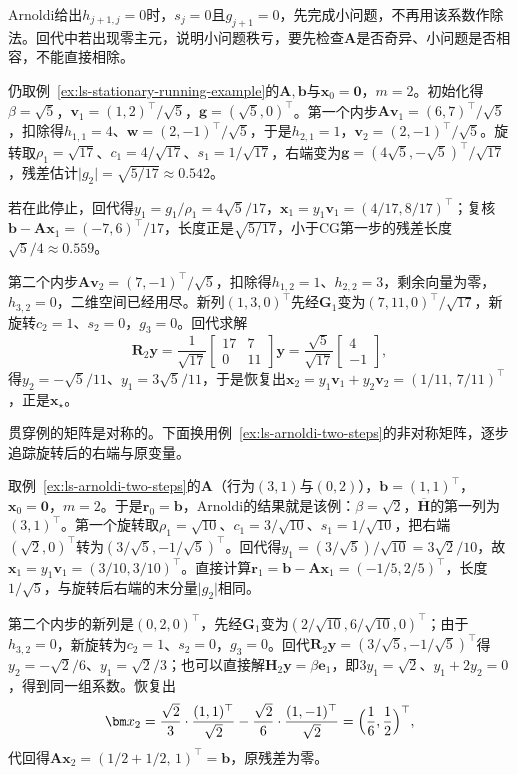 Arnoldi给出$h_{j+1,j}=0$时，$s_j=0$且$g_{j+1}=0$，先完成小问题，不再用该系数作除法。回代中若出现零主元，说明小问题秩亏，要先检查$\bm A$是否奇异、小问题是否相容，不能直接相除。

\begin{example}[GMRES在贯穿例上的两步]
\label{ex:ls-gmres-two-steps}
仍取例~\ref{ex:ls-stationary-running-example}的$\bm A,\bm b$与$\bm x_0=\bm 0$，$m=2$。初始化得$\beta=\sqrt5$，$\bm v_1=(1,2)^\top/\sqrt5$，$\bm g=(\sqrt5,0)^\top$。第一个内步$\bm A\bm v_1=(6,7)^\top/\sqrt5$，扣除得$h_{1,1}=4$、$\bm w=(2,-1)^\top/\sqrt5$，于是$h_{2,1}=1$，$\bm v_2=(2,-1)^\top/\sqrt5$。旋转取$\rho_1=\sqrt{17}$、$c_1=4/\sqrt{17}$、$s_1=1/\sqrt{17}$，右端变为$\bm g=(4\sqrt5,-\sqrt5)^\top/\sqrt{17}$，残差估计$\lvert g_2\rvert=\sqrt{5/17}\approx0.542$。

若在此停止，回代得$y_1=g_1/\rho_1=4\sqrt5/17$，$\bm x_1=y_1\bm v_1=(4/17,8/17)^\top$；复核$\bm b-\bm A\bm x_1=(-7,6)^\top/17$，长度正是$\sqrt{5/17}$，小于CG第一步的残差长度$\sqrt5/4\approx0.559$。

第二个内步$\bm A\bm v_2=(7,-1)^\top/\sqrt5$，扣除得$h_{1,2}=1$、$h_{2,2}=3$，剩余向量为零，$h_{3,2}=0$，二维空间已经用尽。新列$(1,3,0)^\top$先经$\bm G_1$变为$(7,11,0)^\top/\sqrt{17}$，新旋转$c_2=1$、$s_2=0$，$g_3=0$。回代求解
\[
 \bm R_2\bm y=\frac1{\sqrt{17}}\begin{bmatrix}17&7\\0&11\end{bmatrix}\bm y
 =\frac{\sqrt5}{\sqrt{17}}\begin{bmatrix}4\\-1\end{bmatrix},
\]
得$y_2=-\sqrt5/11$、$y_1=3\sqrt5/11$，于是恢复出$\bm x_2=y_1\bm v_1+y_2\bm v_2=(1/11,\,7/11)^\top$，正是$\bm x_\star$。
\end{example}

贯穿例的矩阵是对称的。下面换用例~\ref{ex:ls-arnoldi-two-steps}的非对称矩阵，逐步追踪旋转后的右端与原变量。

\begin{example}[非对称矩阵上的GMRES]
\label{ex:ls-gmres-nonsymmetric}
取例~\ref{ex:ls-arnoldi-two-steps}的$\bm A$（行为$(3,1)$与$(0,2)$），$\bm b=(1,1)^\top$，$\bm x_0=\bm0$，$m=2$。于是$\bm r_0=\bm b$，Arnoldi的结果就是该例：$\beta=\sqrt2$，$\overline{\bm H}$的第一列为$(3,1)^\top$。第一个旋转取$\rho_1=\sqrt{10}$、$c_1=3/\sqrt{10}$、$s_1=1/\sqrt{10}$，把右端$(\sqrt2,0)^\top$转为$(3/\sqrt5,-1/\sqrt5)^\top$。回代得$y_1=(3/\sqrt5)/\sqrt{10}=3\sqrt2/10$，故$\bm x_1=y_1\bm v_1=(3/10,3/10)^\top$。直接计算$\bm r_1=\bm b-\bm A\bm x_1=(-1/5,2/5)^\top$，长度$1/\sqrt5$，与旋转后右端的末分量$\lvert g_2\rvert$相同。

第二个内步的新列是$(0,2,0)^\top$，先经$\bm G_1$变为$(2/\sqrt{10},6/\sqrt{10},0)^\top$；由于$h_{3,2}=0$，新旋转为$c_2=1$、$s_2=0$，$g_3=0$。回代$\bm R_2\bm y=(3/\sqrt5,-1/\sqrt5)^\top$得$y_2=-\sqrt2/6$、$y_1=\sqrt2/3$；也可以直接解$\bm H_2\bm y=\beta\bm e_1$，即$3y_1=\sqrt2$、$y_1+2y_2=0$，得到同一组系数。恢复出
\[
 \bm x_2=\frac{\sqrt2}3\cdot\frac{(1,1)^\top}{\sqrt2}-\frac{\sqrt2}6\cdot\frac{(1,-1)^\top}{\sqrt2}=\Bigl(\frac16,\frac12\Bigr)^\top ,
\]
代回得$\bm A\bm x_2=(1/2+1/2,\,1)^\top=\bm b$，原残差为零。
\end{example}

